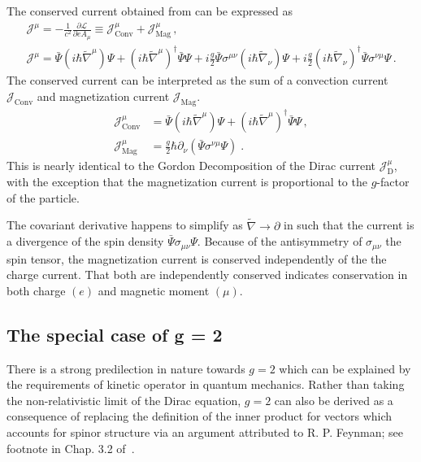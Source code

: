 The conserved current obtained from  can be expressed as
\begin{gather}
\label{norm:2}
\mathcal{J}^{\mu}=-\frac{1}{c^{2}}\frac{\partial\mathcal{L}}{\partial eA_{\mu}}\equiv 
 \mathcal{J}^\mu_{\mathrm{Conv}}+\mathcal{J}^\mu_{\mathrm{Mag}}\,, \\
\mathcal{J}^{\mu}=\bar{\Psi}\left(i\hbar{\widetilde\nabla}^{\mu}\right)\Psi + \left(i\hbar{\widetilde\nabla}^{\mu}\right)^{\dag}\bar{\Psi}\Psi + i\frac{g}{2}\bar{\Psi}\sigma^{\mu\nu}\left(i\hbar{\widetilde\nabla}_{\nu}\right)\Psi + i\frac{g}{2}\left(i\hbar{\widetilde\nabla}_{\nu}\right)^{\dag}\bar{\Psi}\sigma^{\nu\mu}\Psi\,.
\end{gather}
The conserved current  can be interpreted as the sum of a convection current $\mathcal{J}_{\mathrm{Conv}}$ and magnetization current $\mathcal{J}_{\mathrm{Mag}}$.
\begin{align}
\label{norm:3a}\mathcal{J}^{\mu}_{\mathrm{Conv}}&=\bar{\Psi}\left(i\hbar{\widetilde\nabla}^{\mu}\right)\Psi + \left(i\hbar{\widetilde\nabla}^{\mu}\right)^{\dag}\bar{\Psi}\Psi\,,\\
\label{norm:3b} 
\mathcal{J}^{\mu}_{\mathrm{Mag}}&=\frac{g}{2}\hbar{\partial}_{\nu}\left(\bar{\Psi}\sigma^{\nu\mu}\Psi\right)\;.
\end{align}
 This is nearly identical to the Gordon Decomposition of the Dirac current $\mathcal{J}_\mathrm{D}^{\mu}$, with the exception that the magnetization current is proportional to the $g$-factor of the particle.
 
The covariant derivative happens to simplify as $\widetilde\nabla\rightarrow\partial$ in  such that the current is a divergence of the spin density $\bar\Psi\sigma_{\mu\nu}\Psi$. Because of the antisymmetry of $\sigma_{\mu\nu}$ the spin tensor, the magnetization current is conserved independently of the the charge current. That both are independently conserved indicates conservation in both charge $(e)$ and magnetic moment $(\mu)$.


\subsection{The special case of g = 2}
\label{sec:unique}
There is a strong predilection in nature towards $g\!=\!2$ which can be explained by the requirements of kinetic operator in quantum mechanics. Rather than taking the non-relativistic limit of the Dirac equation, $g\!=\!2$ can also be derived as a consequence of replacing the definition of the inner product for vectors which accounts for spinor structure via an argument attributed to R. P. Feynman; see footnote in Chap. 3.2 of~\cite{sakurai1967advanced}.

